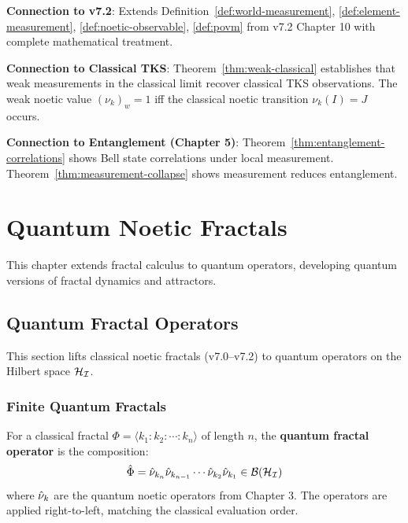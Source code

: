\begin{tcolorbox}[colback=green!5!white,colframe=green!50!black,title=\textbf{Handoff: Next Steps},breakable]
\textbf{Connection to v7.2}: Extends Definition~\ref{def:world-measurement}, \ref{def:element-measurement}, \ref{def:noetic-observable}, \ref{def:povm} from v7.2 Chapter 10 with complete mathematical treatment.

\textbf{Connection to Classical TKS}: Theorem~\ref{thm:weak-classical} establishes that weak measurements in the classical limit recover classical TKS observations. The weak noetic value $(\nu_k)_w = 1$ iff the classical noetic transition $\nu_k(I) = J$ occurs.

\textbf{Connection to Entanglement (Chapter 5)}: Theorem~\ref{thm:entanglement-correlations} shows Bell state correlations under local measurement. Theorem~\ref{thm:measurement-collapse} shows measurement reduces entanglement.
\end{tcolorbox}

\chapter{Quantum Noetic Fractals}
\label{ch:quantum-fractals}

\begin{tcolorbox}[colback=blue!5!white,colframe=blue!75!black,title=\vnewthree]
This chapter extends fractal calculus to quantum operators, developing quantum versions of fractal dynamics and attractors.
\end{tcolorbox}

\section{Quantum Fractal Operators}
\label{sec:quantum-fractal-operators}

This section lifts classical noetic fractals (v7.0--v7.2) to quantum operators on the Hilbert space $\mathcal{H}_{\mathcal{I}}$.

\subsection{Finite Quantum Fractals}

\begin{definition}
\label{def:quantum-fractal-op}
For a classical fractal $\Phi = \langle k_1 : k_2 : \cdots : k_n \rangle$ of length $n$, the \textbf{quantum fractal operator} is the composition:
\[
\hat{\Phi} = \hat{\nu}_{k_n} \hat{\nu}_{k_{n-1}} \cdots \hat{\nu}_{k_2} \hat{\nu}_{k_1} \in \mathcal{B}(\mathcal{H}_{\mathcal{I}})
\]
where $\hat{\nu}_k$ are the quantum noetic operators from Chapter 3. The operators are applied right-to-left, matching the classical evaluation order.
\end{definition}


